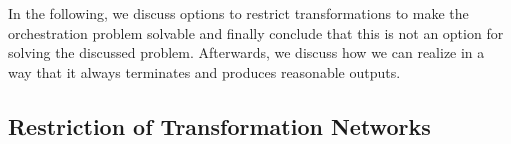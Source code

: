 In the following, we discuss options to restrict transformations to make the orchestration problem solvable and finally conclude that this is not an option for solving the discussed problem.
Afterwards, we discuss how we can realize  in a way that it always terminates and produces reasonable outputs.







\subsection{Restriction of Transformation Networks}
\label{chap:orchestration:decidability:restriction}

